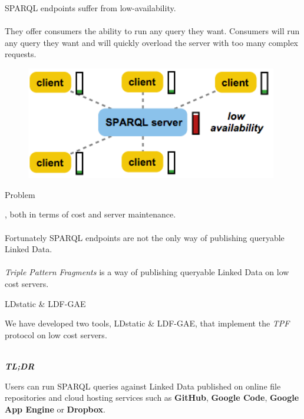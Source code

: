 \documentclass[20pt]{extarticle}
\newcommand{\cmr}{\fontencoding{T1}\fontfamily{ptm}\selectfont} %
\begin{document}
{\fontsize{25}{25} {\cmr 
\noindent SPARQL endpoints {\color{blue}suffer from low-availability.}
\\ \\
They offer consumers the ability to run any query they want. Consumers will run any query they want and will quickly overload the server with too many complex requests.
}
\begin{figure}[ht!]
\centering
\includegraphics[width=110mm]{sparql.png}
\end{figure}



\newpage

 \begin{center}
{\fontsize{35}{35}\color{blue} \sc Problem}
\end{center}

\vspace{10 mm}

{\fontsize{30}{30} {\cmr 
{}, both in terms of cost and server maintenance.
\\ \\
Fortunately SPARQL endpoints are not the only way of publishing queryable Linked Data.
\\ \\
\textit{Triple Pattern Fragments} is a way of publishing queryable Linked Data on low cost servers.
}} 

\newpage


\begin{center}
{\fontsize{35}{35}\color{blue} \sc LDstatic \& LDF-GAE}
\end{center}
\vspace{20 mm}
{\fontsize{30}{30} {\cmr 
\noindent We have developed two tools, LDstatic \& LDF-GAE, that implement the \textit{TPF} protocol on low cost servers.
\\ \\
{\color{blue} 
\textbf{\textit{TL;DR}}

Users can run SPARQL queries against Linked Data published on online file repositories and cloud hosting services such as \textbf{GitHub}, \textbf{Google Code}, \textbf{Google App Engine} or \textbf{Dropbox}.
}
}} 


}
\end{document}
